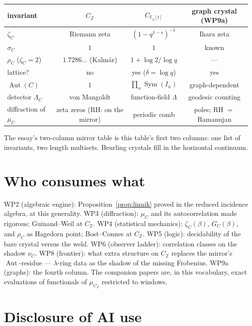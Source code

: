 \documentclass[11pt]{article}
\theoremstyle{remark}
\newcommand{\Z}{\mathbb{Z}}
\newcommand{\F}{\mathbb{F}}
\newcommand{\Aut}{\operatorname{Aut}}
\newcommand{\Sym}{\operatorname{Sym}}
\begin{document}
\begin{center}\small
\begin{tabular}{lccc}
\hline
invariant & $C_{\Z}$ & $C_{\F_q[t]}$ & graph crystal (WP9a) \\
\hline
$\zeta_C$ & Riemann zeta & $(1 - q^{1-s})^{-1}$ & Ihara zeta \\
$\sigma_C$ & $1$ & $1$ & known \\
$\rho_C$ ($\zeta_C = 2$) & $1.7286\ldots$ (Kalm\'ar) & $1 + \log 2/\log q$ & --- \\
lattice? & no & yes ($\delta = \log q$) & yes \\
$\Aut(C)$ & $1$ & $\prod_n \Sym(I_n)$ & graph-dependent \\
detector $\Lambda_C$ & von Mangoldt & function-field $\Lambda$ & geodesic counting \\
diffraction of $\mu_C$ & zeta zeros (RH: on the mirror) & periodic comb & poles; RH $=$ Ramanujan \\
\hline
\end{tabular}
\end{center}

\noindent
The essay's two-column mirror table \cite{Essay} is this table's first two columns: one list of
invariants, two length multisets. Beurling crystals fill in the horizontal continuum.

\section{Who consumes what}

WP2 (algebraic engine): Proposition~\ref{prop:linnik} proved in the reduced incidence algebra, at
this generality. WP3 (diffraction): $\mu_C$ and its autocorrelation made rigorous; Guinand--Weil at
$C_{\Z}$. WP4 (statistical mechanics): $\zeta_C(\beta)$, $G_C(\beta)$, and $\rho_C$ as Hagedorn
point; Bost--Connes at $C_{\Z}$. WP5 (logic): decidability of the bare crystal versus the weld.
WP6 (observer ladder): correlation classes on the shadow $\nu_C$. WP8 (frontier): what extra
structure on $C_{\Z}$ replaces the mirror's $\Aut$-residue --- $\lambda$-ring data as the shadow of
the missing Frobenius. WP9a (graphs): the fourth column. The companion papers
\cite{CompanionI, CompanionII, CompanionIII} are, in this vocabulary, exact evaluations of
functionals of $\mu_{C_\Z}$ restricted to windows.

\section*{Disclosure of AI use}
\end{document}
